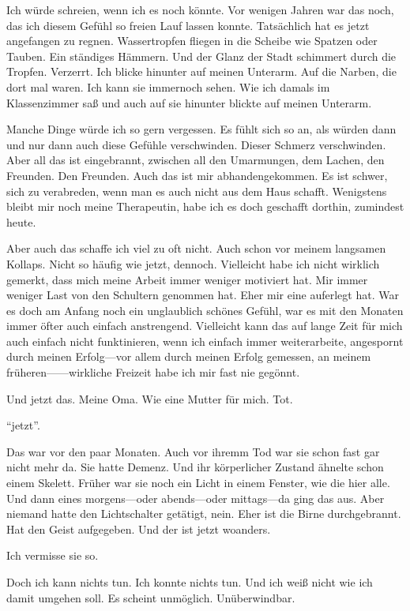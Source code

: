 \documentclass{article}
\begin{document}
	\medskip

	Ich würde schreien, wenn ich es noch könnte. Vor wenigen Jahren war das noch, das ich diesem Gefühl so freien Lauf lassen konnte. Tatsächlich hat es jetzt angefangen zu regnen. Wassertropfen fliegen in die Scheibe wie Spatzen oder Tauben. Ein ständiges Hämmern. Und der Glanz der Stadt schimmert durch die Tropfen. Verzerrt. Ich blicke hinunter auf meinen Unterarm. Auf die Narben, die dort mal waren. Ich kann sie immernoch sehen. Wie ich damals im Klassenzimmer saß und auch auf sie hinunter blickte auf meinen Unterarm.

	\medskip

	Manche Dinge würde ich so gern vergessen. Es fühlt sich so an, als würden dann und nur dann auch diese Gefühle verschwinden. Dieser Schmerz verschwinden. Aber all das ist eingebrannt, zwischen all den Umarmungen, dem Lachen, den Freunden. Den Freunden. Auch das ist mir abhandengekommen. Es ist schwer, sich zu verabreden, wenn man es auch nicht aus dem Haus schafft. Wenigstens bleibt mir noch meine Therapeutin, habe ich es doch geschafft dorthin, zumindest heute.

	\medskip

	Aber auch das schaffe ich viel zu oft nicht. Auch schon vor meinem langsamen Kollaps. Nicht so häufig wie jetzt, dennoch. Vielleicht habe ich nicht wirklich gemerkt, dass mich meine Arbeit immer weniger motiviert hat. Mir immer weniger Last von den Schultern genommen hat. Eher mir eine auferlegt hat. War es doch am Anfang noch ein unglaublich schönes Gefühl, war es mit den Monaten immer öfter auch einfach anstrengend. Vielleicht kann das auf lange Zeit für mich auch einfach nicht funktinieren, wenn ich einfach immer weiterarbeite, angespornt durch meinen Erfolg—vor allem durch meinen Erfolg gemessen, an meinem früheren——wirkliche Freizeit habe ich mir fast nie gegönnt.

	\medskip

	Und jetzt das. Meine Oma. Wie eine Mutter für mich. Tot. 

	\medskip

	\enquote{jetzt}.

	\medskip

	Das war vor den paar Monaten. Auch vor ihremm Tod war sie schon fast gar nicht mehr da. Sie hatte Demenz. Und ihr körperlicher Zustand ähnelte schon einem Skelett. Früher war sie noch ein Licht in einem Fenster, wie die hier alle. Und dann eines morgens—oder abends—oder mittags—da ging das aus. Aber niemand hatte den Lichtschalter getätigt, nein. Eher ist die Birne durchgebrannt. Hat den Geist aufgegeben. Und der ist jetzt woanders.

	\medskip

	Ich vermisse sie so.

	\medskip

	Doch ich kann nichts tun. Ich konnte nichts tun. Und ich weiß nicht wie ich damit umgehen soll. Es scheint unmöglich. Unüberwindbar.
\end{document}

